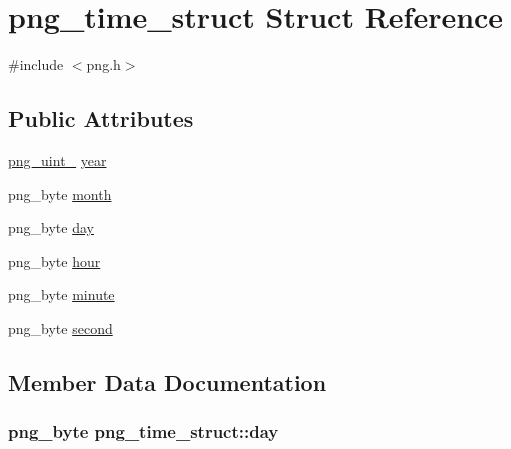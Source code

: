 \hypertarget{structpng__time__struct}{}\section{png\+\_\+time\+\_\+struct Struct Reference}
\label{structpng__time__struct}


{\ttfamily \#include $<$png.\+h$>$}

\subsection*{Public Attributes}
\begin{DoxyCompactItemize}
\item 
\hyperlink{pngrutil_8c_a7b67546e4211b127dd370e8ef197bc3f}{png\+\_\+uint\+\_} \hyperlink{structpng__time__struct_a5cceb6213fc7b4462435ea1d8fc1c798}{year}
\item 
png\+\_\+byte \hyperlink{structpng__time__struct_a3ab550977ee2cb1165c0398131f2e601}{month}
\item 
png\+\_\+byte \hyperlink{structpng__time__struct_afa0f94516a676178d1dabeb96eccdcdb}{day}
\item 
png\+\_\+byte \hyperlink{structpng__time__struct_a79ac8b217254fd87cdc7299e6612a6f4}{hour}
\item 
png\+\_\+byte \hyperlink{structpng__time__struct_ad3ce11e9d92b77a33b3f7480bf0fff8c}{minute}
\item 
png\+\_\+byte \hyperlink{structpng__time__struct_a84e528e4c4c7d76cd2252e0d0d2ed0c9}{second}
\end{DoxyCompactItemize}


\subsection{Member Data Documentation}
\hypertarget{structpng__time__struct_afa0f94516a676178d1dabeb96eccdcdb}{}
\subsubsection[{day}]{\setlength{\rightskip}{0pt plus 5cm}png\+\_\+byte png\+\_\+time\+\_\+struct\+::day}\label{structpng__time__struct_afa0f94516a676178d1dabeb96eccdcdb}
\hypertarget{structpng__time__struct_a79ac8b217254fd87cdc7299e6612a6f4}{}
